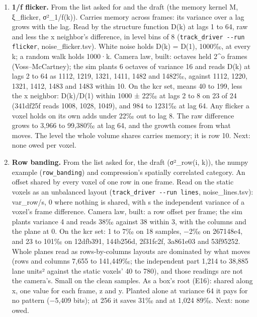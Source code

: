 \begin{enumerate}
\begin{itemize}
\item Prior art, cited from knowledge. The photon transfer method, reading gain, read noise and dark signal from the mean and variance of flat, dark and bias frames, and kTC noise removed by correlated double sampling: J. R. Janesick, “Photon Transfer: DN → λ”, SPIE Press, 2007.
\end{itemize}
\item \textbf{1/f flicker.} From the list asked for and the draft (the memory kernel M, ξ\_\allowbreak{}flicker, σ²\_\allowbreak{}1/f(k)). Carries memory across frames: its variance over a lag grows with the lag. Read by the structure function D(k) at lags 1 to 64, raw and less the x neighbor's difference, in level bins of 8 (\texttt{track\_\allowbreak{}driver -\allowbreak{}-\allowbreak{}run flicker}, noise\_\allowbreak{}flicker.tsv). White noise holds D(k) = D(1), 1000‰, at every k; a random walk holds 1000·k. Camera law, built: octaves held 2\textasciicircum{}o frames (Voss–McCartney); the sim plants 6 octaves of variance 16 and reads D(k) at lags 2 to 64 as 1112, 1219, 1321, 1411, 1482 and 1482‰, against 1112, 1220, 1321, 1412, 1483 and 1483 within 10. On the kcr set, means 40 to 199, less the x neighbor: D(k)/D(1) within 1000 ± 22‰ at lags 2 to 8 on 23 of 24 (341df25f reads 1008, 1028, 1049), and 984 to 1231‰ at lag 64. Any flicker a voxel holds on its own adds under 22‰ out to lag 8. The raw difference grows to 3,966 to 99,380‰ at lag 64, and the growth comes from what moves. The level the whole volume shares carries memory; it is row 10. Next: none owed per voxel.
\item \textbf{Row banding.} From the list asked for, the draft (σ²\_\allowbreak{}row(i, k)), the numpy example (\texttt{row\_\allowbreak{}banding}) and compression's spatially correlated category. An offset shared by every voxel of one row in one frame. Read on the static voxels as an unbalanced layout (\texttt{track\_\allowbreak{}driver -\allowbreak{}-\allowbreak{}run lines}, noise\_\allowbreak{}lines.tsv): var\_\allowbreak{}row/s, 0 where nothing is shared, with s the independent variance of a voxel's frame difference. Camera law, built: a row offset per frame; the sim plants variance 4 and reads 38‰ against 38 within 3, with the columns and the plane at 0. On the kcr set: 1 to 7‰ on 18 samples, −2‰ on 267148e4, and 23 to 101‰ on 12dfb391, 144b256d, 2f31fc2f, 3a861e03 and 53f95252. Whole planes read as rows-by-columns layouts are dominated by what moves (rows and columns 7,655 to 141,449‰; the independent part 1,214 to 38,885 lane units² against the static voxels' 40 to 780), and those readings are not the camera's. Small on the clean samples. As a box's root (E16): shared along x, one value for each frame, z and y. Planted alone at variance 64 it pays for no pattern (−5,409 bits); at 256 it saves 31‰ and at 1,024 89‰. Next: none owed.

\end{enumerate}
